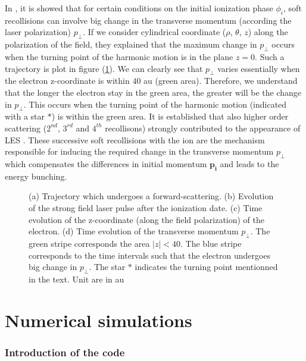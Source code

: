 \documentclass[a4paper]{article}
\begin{document}
In \cite{Liu_2010}, it is showed that for certain conditions on the initial ionization phase $\phi_{i}$, soft recollisions can involve big change in the transverse momentum (according the laser polarization) $p_{\perp}$. If we consider cylindrical coordinate ($\rho$, $\theta$, $z$) along the polarization of the field, they explained that the maximum change in $p_{\perp}$ occurs when the turning point of the harmonic motion is in the plane $z=0$. Such a trajectory is plot in figure (\ref{soft_recollision}). We can clearly see that $p_{\perp}$ varies essentially when the electron z-coordinate is within $40$ au (green area). Therefore, we understand that the longer the electron stay in the green area, the greater will be the change in $p_{\perp}$. This occurs when the turning point of the harmonic motion (indicated with a star $*$) is within the green area. It is established that also higher order scattering ($2^{nd}$, $3^{rd}$ and $4^{th}$ recollisons) strongly contributed to the appearance of LES \cite{Liu_2010}. These successive soft recollisions with the ion are the mechanism responsible for inducing the required change in the transverse momentum $p_{\perp}$ which compensates the differences in initial momentum $\mathbf{p_{i}}$ and leads to the energy bunching.
\par



\begin{figure}
 \resizebox{1\textwidth}{!}{}
 \caption{ (a) Trajectory which undergoes a forward-scattering. (b) Evolution of the strong field laser pulse after the ionization date. (c) Time evolution of the z-coordinate (along the field polarization) of the electron. (d) Time evolution of the transverse momentum $p_{\perp}$. The green stripe corresponds the area $|z|<40$. The blue stripe corresponds to the time intervals such that the electron undergoes big change in $p_{\perp}$. The star $*$ indicates the turning point mentionned in the text. Unit are in au}
 \label{soft_recollision}
\end{figure}





\section{Numerical simulations}
\subsubsection{Introduction of the code}
\end{document}
